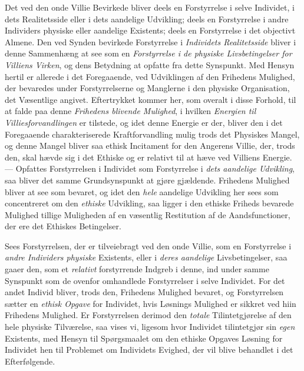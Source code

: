 Det ved den onde Villie Bevirkede bliver deels en Forstyrrelse i selve Individet,
i dets Realitetsside eller i dets aandelige Udvikling; deels en Forstyrrelse i
andre Individers physiske eller aandelige Existents; deels en Forstyrrelse i det
objectivt Almene. Den ved Synden bevirkede Forstyrrelse i \emph{Individets
Realitetsside} bliver i denne Sammenhæng at see som en \emph{Forstyrrelse i de
physiske Livsbetingelser for Villiens Virken}, og dens Betydning at opfatte fra
dette Synspunkt. Med Hensyn hertil er allerede i det Foregaaende, ved Udviklingen
af den Frihedens Mulighed, der bevaredes under Forstyrrelserne og Manglerne i den
physiske Organisation, det Væsentlige angivet. Eftertrykket kommer her, som
overalt i disse Forhold, til at falde paa denne \emph{Frihedens blivende
Mulighed}, i hvilken \emph{Energien til Villiesforvandlingen} er tilstede, og
idet denne Energie er der, bliver den i det Foregaaende charakteriserede
Kraftforvandling mulig trods det Physiskes Mangel, og denne Mangel bliver saa
ethisk Incitament for den Angerens Villie, der, trods den, skal hævde sig i det
Ethiske og er relativt til at hæve ved Villiens Energie. --- Opfattes
Forstyrrelsen i Individet som Forstyrrelse i \emph{dets aandelige Udvikling}, saa
bliver det samme Grundsynspunkt at gjøre gjældende. Frihedens Mulighed bliver at
see som bevaret, og idet den \emph{hele} aandelige Udvikling her sees som
concentreret om den \emph{ethiske} Udvikling, saa ligger i den ethiske Friheds
bevarede Mulighed tillige Muligheden af en væsentlig Restitution af de
Aandsfunctioner, der ere det Ethiskes Betingelser.

 Sees Forstyrrelsen, der er tilveiebragt ved den onde Villie, som en Forstyrrelse
i \emph{andre Individers physiske} Existents, eller i \emph{deres aandelige}
Livsbetingelser, saa gaaer den, som et \emph{relativt} forstyrrende Indgreb i
denne, ind under samme Synspunkt som de ovenfor omhandlede Forstyrrelser i selve
Individet. For det andet Individ bliver, trods den, Frihedens Mulighed bevaret,
og Forstyrrelsen sætter en \emph{ethisk Opgave} for Individet, hvis Løsnings
Mulighed er sikkret ved hiin Frihedens Mulighed. Er Forstyrrelsen derimod den
\emph{totale} Tilintetgjørelse af den hele physiske Tilværelse, saa vises vi,
ligesom hvor Individet tilintetgjør sin \emph{egen} Existents, med Hensyn til
Spørgsmaalet om den ethiske Opgaves Løsning for Individet hen til Problemet om
Individets Evighed, der vil blive behandlet i det Efterfølgende.

